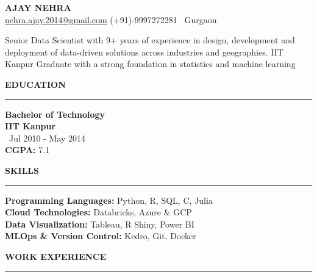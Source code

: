 \documentclass[a4paper,10pt]{article}
\begin{document}
\begin{center}
    \textbf{\LARGE \MakeUppercase{Ajay Nehra}} \\
    \vspace{1mm}
    \href{mailto:nehra.ajay.2014@gmail.com}{nehra.ajay.2014@gmail.com} \hspace{5mm} (+91)-9997272281 \hspace{5mm} \faMapMarker \,  Gurgaon
\end{center}

\vspace{1mm} %

Senior Data Scientist with 9+ years of experience in design, development and deployment of data-driven solutions across industries and geographies. IIT Kanpur Graduate with a strong foundation in statistics and machine learning

\vspace{1mm}

\begin{multicols}{2}

\textbf{\LARGE \MakeUppercase{Education}} \\
\vspace{0mm}
\rule{\columnwidth}{0.8pt} %
\textbf{Bachelor of Technology} \\
\textbf{IIT Kanpur} \\
\faCalendar \, Jul 2010 - May 2014 \\
\textbf{CGPA:} 7.1

\columnbreak

\textbf{\LARGE \MakeUppercase{Skills}} \\
\vspace{0mm}
\rule{\columnwidth}{0.8pt} %
\textbf{Programming Languages:} Python, R, SQL, C, Julia\\
\textbf{Cloud Technologies:} Databricks, Azure \& GCP\\
\textbf{Data Visualization:} Tableau, R Shiny, Power BI \\
\textbf{MLOps \& Version Control:} Kedro, Git, Docker

\end{multicols}

\vspace{1mm} %

\textbf{\LARGE \MakeUppercase{Work Experience}} \\
\vspace{1mm}
\rule{\textwidth}{0.8pt} %
\end{document}
